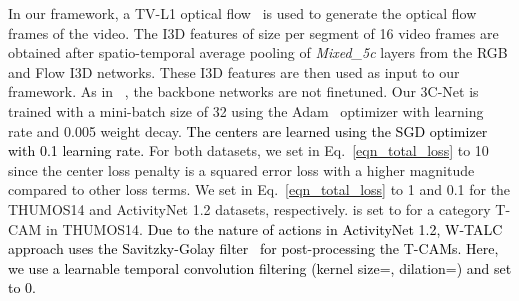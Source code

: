 \documentclass[10pt,twocolumn,letterpaper]{article}
\begin{document}
In our framework, a TV-L1 optical flow~\cite{tvl1-flow} is used to generate the optical flow frames of the video. The I3D features of size  per segment of 16 video frames are obtained after spatio-temporal average pooling of \emph{Mixed\_5c} layers from the RGB and Flow I3D networks. These I3D features are then used as input to our framework. As in ~\cite{stpn,wtalc}, the backbone networks are not finetuned. Our 3C-Net is trained with a mini-batch size of 32 using the Adam~\cite{adam} optimizer with  learning rate and 0.005 weight decay. \textcolor{black}{The centers  are learned using the SGD optimizer with 0.1 learning rate.} For both datasets, we set  in Eq.~\ref{eqn_total_loss} to 10 since the center loss penalty is a squared error loss with a higher magnitude compared to other loss terms. We set  in Eq.~\ref{eqn_total_loss} to 1 and 0.1 for the THUMOS14 and ActivityNet 1.2 datasets, respectively. 
 is set to  for a  category T-CAM in THUMOS14. \textcolor{black}{Due to the nature of actions in ActivityNet 1.2, W-TALC~\cite{wtalc} approach uses the Savitzky-Golay filter~\cite{savitzky1964smoothing} for post-processing the T-CAMs. Here, we use a learnable temporal convolution filtering (kernel size=, dilation=) and set  to 0.}
\end{document}
